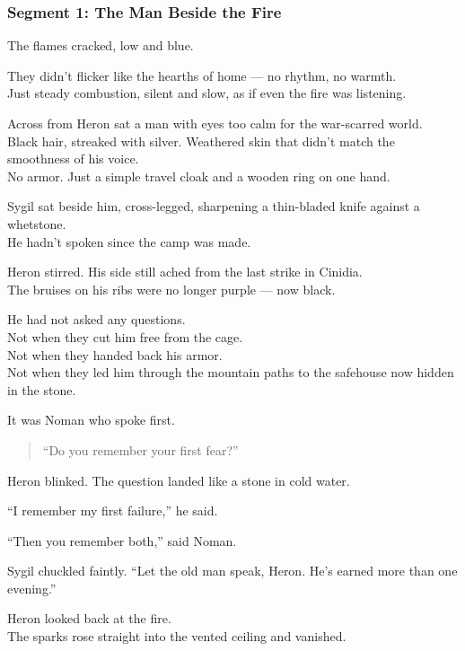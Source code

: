 \documentclass[9pt]{article}
\begin{document}
\newpage

\subsubsection*{Segment 1: The Man Beside the Fire}

The flames cracked, low and blue.

They didn’t flicker like the hearths of home — no rhythm, no warmth.\\
Just steady combustion, silent and slow, as if even the fire was listening.

Across from Heron sat a man with eyes too calm for the war-scarred world.\\
Black hair, streaked with silver. Weathered skin that didn’t match the smoothness of his voice.\\
No armor. Just a simple travel cloak and a wooden ring on one hand.

Sygil sat beside him, cross-legged, sharpening a thin-bladed knife against a whetstone.\\
He hadn’t spoken since the camp was made.

Heron stirred. His side still ached from the last strike in Cinidia.\\
The bruises on his ribs were no longer purple — now black.

He had not asked any questions.\\
Not when they cut him free from the cage.\\
Not when they handed back his armor.\\
Not when they led him through the mountain paths to the safehouse now hidden in the stone.

It was Noman who spoke first.

\begin{quote}
“Do you remember your first fear?” 
\end{quote}

Heron blinked. The question landed like a stone in cold water.

“I remember my first failure,” he said.

“Then you remember both,” said Noman.

\vspace{1em}

Sygil chuckled faintly. “Let the old man speak, Heron. He’s earned more than one evening.”

Heron looked back at the fire.\\
The sparks rose straight into the vented ceiling and vanished.
\end{document}
